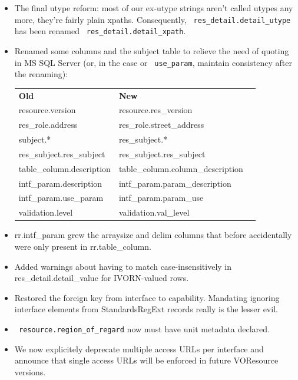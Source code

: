 \documentclass[11pt,a4paper]{ivoa}
\newcommand{\rtent}[1]{\texttt{\color{rtcolor} #1}}
\begin{document}
\label{changes-20130411}


\begin{itemize}

\item The final utype reform: most of our ex-utype strings aren't called utypes
  any more, they're fairly plain xpaths.  Consequently, 
  \rtent{res\_detail.detail\_utype} has been renamed 
  \rtent{res\_detail.detail\_xpath}.{}

\item Renamed some columns and the subject table to relieve the need of quoting
  in MS SQL Server (or, in the case or \rtent{use\_param}, maintain
  consistency after the renaming):\\

\begin{tabular}{lll}

\textbf{Old}&
\textbf{New}\\
resource.version&resource.res\_version\\
res\_role.address&res\_role.street\_address\\
subject.*&res\_subject.*\\
res\_subject.res\_subject&res\_subject.res\_subject\\
table\_column.description&table\_column.column\_description\\
intf\_param.description&intf\_param.param\_description\\
intf\_param.use\_param&intf\_param.param\_use\\
validation.level&validation.val\_level\\

\end{tabular}

\item rr.intf\_param grew the arraysize and delim columns that before
    accidentally were only present in rr.table\_column.{}

\item Added warnings about having to match case-insensitively in
  res\_detail.detail\_value for IVORN-valued rows.{}

\item Restored the foreign key from interface to capability.  Mandating
  ignoring interface elements from StandardsRegExt records really is the
  lesser evil.{}

\item \rtent{resource.region\_of\_regard} now must have unit metadata
  declared.{}

\item We now explicitely deprecate multiple access URLs per interface
  and announce that single access URLs will be enforced in future
  VOResource versions.{}

\end{itemize}
\end{document}
